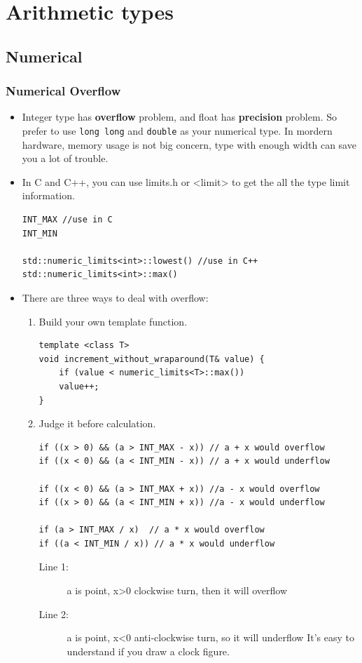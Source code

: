 \documentclass[a4paper,11pt,twoside]{book}
\begin{document}
\section{Arithmetic types}
\subsection{Numerical}
\subsubsection{Numerical Overflow}

\begin{itemize}
	\item Integer type has \textbf{overflow} problem, and float has \textbf{precision} problem. So prefer to use \texttt{long long} and \texttt{double} as your numerical type. In mordern hardware, memory usage is not big concern, type with enough width can save you a lot of trouble. 
	
	\item In C and C++, you can use limits.h or <limit> to get the all the type limit information.
	
\begin{lstlisting}[numbers=none]
INT_MAX //use in C
INT_MIN
	
std::numeric_limits<int>::lowest() //use in C++
std::numeric_limits<int>::max()
\end{lstlisting}
	
	\item There are three ways to deal with overflow:
	\begin{enumerate}
		\item Build your own template function.
\begin{lstlisting}[numbers=none]
template <class T>
void increment_without_wraparound(T& value) {
	if (value < numeric_limits<T>::max())
	value++;
}
\end{lstlisting}
		
		\item  Judge it before calculation.
\begin{lstlisting}
if ((x > 0) && (a > INT_MAX - x)) // a + x would overflow 
if ((x < 0) && (a < INT_MIN - x)) // a + x would underflow

if ((x < 0) && (a > INT_MAX + x)) //a - x would overflow 
if ((x > 0) && (a < INT_MIN + x)) //a - x would underflow

if (a > INT_MAX / x)  // a * x would overflow 
if ((a < INT_MIN / x)) // a * x would underflow 
\end{lstlisting}
\begin{description}
	\item[Line 1:] a is point, x>0 clockwise turn, then it will overflow
	\item[Line 2:] a is point, x<0 anti-clockwise turn,  so it will underflow It's easy to understand if you draw a clock figure.
\end{description}
		

\end{enumerate}
\end{itemize}
\end{document}
